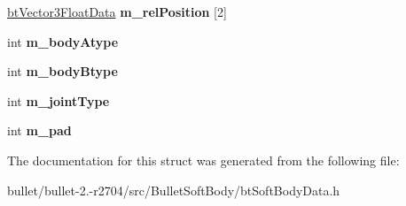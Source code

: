 \begin{DoxyCompactItemize}
\item 
\hypertarget{structbt_soft_body_joint_data_a3253593e164dccf56f61a473ecd24549}{\hyperlink{structbt_vector3_float_data}{bt\+Vector3\+Float\+Data} {\bfseries m\+\_\+rel\+Position} \mbox{[}2\mbox{]}}\label{structbt_soft_body_joint_data_a3253593e164dccf56f61a473ecd24549}

\item 
\hypertarget{structbt_soft_body_joint_data_a496ebce7c9805781d14f941986ac5feb}{int {\bfseries m\+\_\+body\+Atype}}\label{structbt_soft_body_joint_data_a496ebce7c9805781d14f941986ac5feb}

\item 
\hypertarget{structbt_soft_body_joint_data_a13ea08e1cfa0ebbe7f4e7bb4b3147e69}{int {\bfseries m\+\_\+body\+Btype}}\label{structbt_soft_body_joint_data_a13ea08e1cfa0ebbe7f4e7bb4b3147e69}

\item 
\hypertarget{structbt_soft_body_joint_data_ab0620ed64c79d8abdbcd3ed739e7a0c3}{int {\bfseries m\+\_\+joint\+Type}}\label{structbt_soft_body_joint_data_ab0620ed64c79d8abdbcd3ed739e7a0c3}

\item 
\hypertarget{structbt_soft_body_joint_data_a536a5b93ea0375611ac457085d63dd7c}{int {\bfseries m\+\_\+pad}}\label{structbt_soft_body_joint_data_a536a5b93ea0375611ac457085d63dd7c}

\end{DoxyCompactItemize}


The documentation for this struct was generated from the following file\+:\begin{DoxyCompactItemize}
\item 
bullet/bullet-\/2.-\/r2704/src/\+Bullet\+Soft\+Body/bt\+Soft\+Body\+Data.\+h\end{DoxyCompactItemize}
